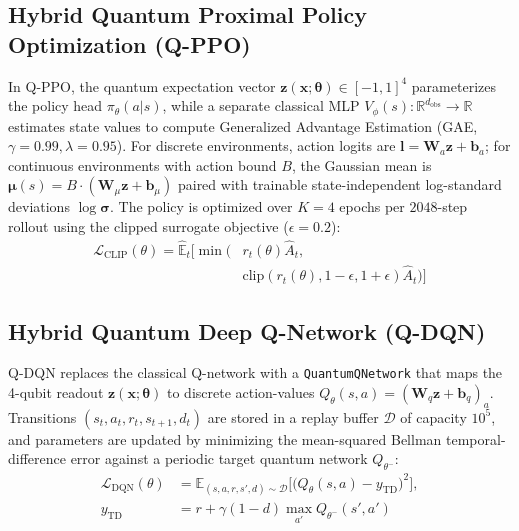 \documentclass[conference]{IEEEtran}
\begin{document}
\subsection{Hybrid Quantum Proximal Policy Optimization (Q-PPO)}
In Q-PPO, the quantum expectation vector $\mathbf{z}(\mathbf{x}; \boldsymbol{\theta}) \in [-1, 1]^4$ parameterizes the policy head $\pi_\theta(a|s)$, while a separate classical MLP $V_\phi(s): \mathbb{R}^{d_{\text{obs}}} \to \mathbb{R}$ estimates state values to compute Generalized Advantage Estimation (GAE, $\gamma=0.99, \lambda=0.95$). For discrete environments, action logits are $\mathbf{l} = \mathbf{W}_a \mathbf{z} + \mathbf{b}_a$; for continuous environments with action bound $B$, the Gaussian mean is $\boldsymbol{\mu}(s) = B \cdot (\mathbf{W}_\mu \mathbf{z} + \mathbf{b}_\mu)$ paired with trainable state-independent log-standard deviations $\log \boldsymbol{\sigma}$. The policy is optimized over $K=4$ epochs per $2048$-step rollout using the clipped surrogate objective ($\epsilon=0.2$):
\begin{equation}
\begin{aligned}
\mathcal{L}_{\text{CLIP}}(\theta) = \hat{\mathbb{E}}_t \Big[ \min\big( &r_t(\theta)\hat{A}_t, \\
&\text{clip}(r_t(\theta), 1-\epsilon, 1+\epsilon)\hat{A}_t \big) \Big]
\end{aligned}
\end{equation}

\subsection{Hybrid Quantum Deep Q-Network (Q-DQN)}
Q-DQN replaces the classical Q-network with a \texttt{QuantumQNetwork} that maps the 4-qubit readout $\mathbf{z}(\mathbf{x}; \boldsymbol{\theta})$ to discrete action-values $Q_\theta(s, a) = (\mathbf{W}_q \mathbf{z} + \mathbf{b}_q)_a$. Transitions $(s_t, a_t, r_t, s_{t+1}, d_t)$ are stored in a replay buffer $\mathcal{D}$ of capacity $10^5$, and parameters are updated by minimizing the mean-squared Bellman temporal-difference error against a periodic target quantum network $Q_{\theta^-}$:
\begin{equation}
\begin{aligned}
\mathcal{L}_{\text{DQN}}(\theta) &= \mathbb{E}_{(s,a,r,s',d)\sim\mathcal{D}} \Big[ \big( Q_\theta(s,a) - y_{\text{TD}} \big)^2 \Big], \\
y_{\text{TD}} &= r + \gamma (1-d)\max_{a'} Q_{\theta^-}(s', a')
\end{aligned}
\end{equation}
\end{document}
